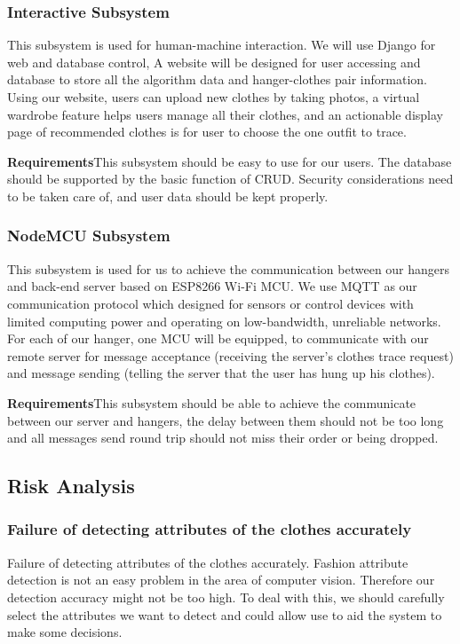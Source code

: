 \subsubsection{Interactive Subsystem}
\setlength{\parindent}{2em}This subsystem is used for human-machine interaction. We will use Django for web and database control, A website will be designed for user accessing and database to store all the algorithm data and hanger-clothes pair information. Using our website, users can upload new clothes by taking photos, a virtual wardrobe feature helps users manage all their clothes, and an actionable display page of recommended clothes is for user to choose the one outfit to trace.

\noindent\textbf{Requirements}\quad This subsystem should be easy to use for our users. The database should be supported by the basic function of CRUD. Security considerations need to be taken care of, and user data should be kept properly. 

\subsubsection{NodeMCU Subsystem}
\setlength{\parindent}{2em}This subsystem is used for us to achieve the communication between our hangers and back-end server based on ESP8266 Wi-Fi MCU. We use MQTT as our communication protocol which designed for sensors or control devices with limited computing power and operating on low-bandwidth, unreliable networks. For each of our hanger, one MCU will be equipped, to communicate with our remote server for message acceptance (receiving the server's clothes trace request) and message sending (telling the server that the user has hung up his clothes).  

\noindent\textbf{Requirements}\quad This subsystem should be able to achieve the communicate between our server and hangers, the delay between them should not be too long and all messages send round trip should not miss their order or being dropped.

\subsection{Risk Analysis}  
\subsubsection{Failure of detecting attributes of the clothes accurately}
\noindent Failure of detecting attributes of the clothes accurately. Fashion attribute detection is not an easy problem in the area of computer vision. Therefore our detection accuracy might not be too high. To deal with this, we should carefully select the attributes we want to detect and could allow use to aid the system to make some decisions.
